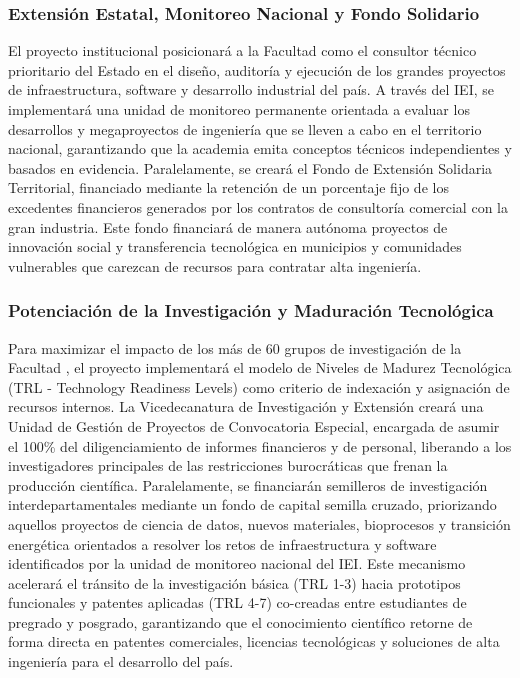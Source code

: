 \documentclass[journal,10pt,twocolumn,letterpaper]{IEEEtran}
\begin{document}
\subsubsection{Extensión Estatal, Monitoreo Nacional y Fondo Solidario}
El proyecto institucional posicionará a la Facultad como el consultor técnico prioritario del Estado en el diseño, auditoría y ejecución de los grandes proyectos de infraestructura, software y desarrollo industrial del país. A través del IEI, se implementará una unidad de monitoreo permanente orientada a evaluar los desarrollos y megaproyectos de ingeniería que se lleven a cabo en el territorio nacional, garantizando que la academia emita conceptos técnicos independientes y basados en evidencia. Paralelamente, se creará el Fondo de Extensión Solidaria Territorial, financiado mediante la retención de un porcentaje fijo de los excedentes financieros generados por los contratos de consultoría comercial con la gran industria. Este fondo financiará de manera autónoma proyectos de innovación social y transferencia tecnológica en municipios y comunidades vulnerables que carezcan de recursos para contratar alta ingeniería.

\subsubsection{Potenciación de la Investigación y Maduración Tecnológica}
Para maximizar el impacto de los más de 60 grupos de investigación de la Facultad \cite{horus}, el proyecto implementará el modelo de Niveles de Madurez Tecnológica (TRL - Technology Readiness Levels) como criterio de indexación y asignación de recursos internos. La Vicedecanatura de Investigación y Extensión creará una Unidad de Gestión de Proyectos de Convocatoria Especial, encargada de asumir el 100\% del diligenciamiento de informes financieros y de personal, liberando a los investigadores principales de las restricciones burocráticas que frenan la producción científica. Paralelamente, se financiarán semilleros de investigación interdepartamentales mediante un fondo de capital semilla cruzado, priorizando aquellos proyectos de ciencia de datos, nuevos materiales, bioprocesos y transición energética orientados a resolver los retos de infraestructura y software identificados por la unidad de monitoreo nacional del IEI. Este mecanismo acelerará el tránsito de la investigación básica (TRL 1-3) hacia prototipos funcionales y patentes aplicadas (TRL 4-7) co-creadas entre estudiantes de pregrado y posgrado, garantizando que el conocimiento científico retorne de forma directa en patentes comerciales, licencias tecnológicas y soluciones de alta ingeniería para el desarrollo del país.
\end{document}
